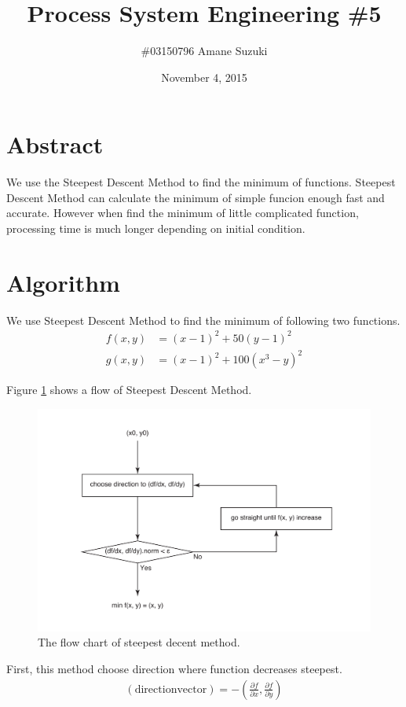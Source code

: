 \documentclass[a4paper,titlepage]{article}
\begin{document}
  \title{Process System Engineering \#5}
  \author{\#03150796 Amane Suzuki}
  \date{November 4, 2015}
  \maketitle

  \section{Abstract}
  We use the Steepest Descent Method to find the minimum of functions.
  Steepest Descent Method can calculate the minimum of simple funcion enough fast and accurate.
  However when find the minimum of little complicated function, processing time is much longer depending on initial condition.

  \section{Algorithm}
  We use Steepest Descent Method to find the minimum of following two functions.
  \begin{align}
    f(x,y) &= (x-1)^2 + 50(y-1)^2 \\
    g(x,y) &= (x-1)^2 + 100(x^3-y)^2
  \end{align}

  Figure \ref{fig:sdm} shows a flow of Steepest Descent Method.

  \begin{figure}[htbp]
    \centering
    \includegraphics[width=12cm]{images/sdm.pdf}
    \caption{The flow chart of steepest decent method.}
    \label{fig:sdm}
  \end{figure}

  First, this method choose direction where function decreases steepest.
  \begin{align}
    (\mathrm{direction vector}) = - \left(\frac{\partial f}{\partial x} , \frac{\partial f}{\partial y}\right)
  \end{align}
\end{document}
